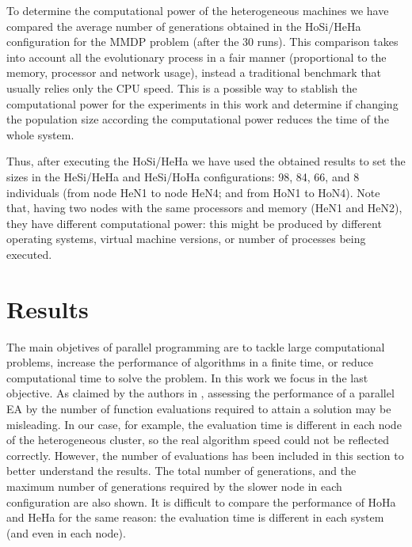  
To determine the computational power of the heterogeneous machines we have compared the average number of generations obtained in the HoSi/HeHa configuration for the MMDP problem (after the 30 runs). This comparison takes into account all the evolutionary process in a fair manner (proportional to the memory, processor and network usage), instead a traditional benchmark that usually relies only the CPU speed. This is a possible way to stablish the computational power for the experiments in this work and determine if changing the population size according the computational power reduces the time of the whole system.

Thus, after executing the HoSi/HeHa we have used the obtained results to set the sizes in the HeSi/HeHa and HeSi/HoHa configurations: 98, 84, 66, and 8 individuals (from node HeN1 to node HeN4; and from HoN1 to HoN4). Note that, having two nodes with the same processors and memory (HeN1 and HeN2), they have different computational power: this might be produced by different operating systems, virtual machine versions, or number of processes being executed.






\section{Results}
\label{sec:results}

The main objetives of parallel programming are to tackle large computational problems, increase the performance of algorithms in a finite time, or reduce computational time to solve the problem. In this work we focus in the last objective.
As claimed by the authors in \cite{EVALUATIONPARALLEL}, assessing the performance of a parallel EA by the number of function evaluations required to attain a solution may be misleading. In our case, for example, the evaluation time is different in each node of the heterogeneous cluster, so the real algorithm speed could not be reflected correctly. However, the number of evaluations has been included in this section to better understand the results. The total number of generations, and the maximum number of generations required by the slower node in each configuration are also shown. It is difficult to compare the performance of HoHa and HeHa for the same reason: the evaluation time is different in each system (and even in each node).

